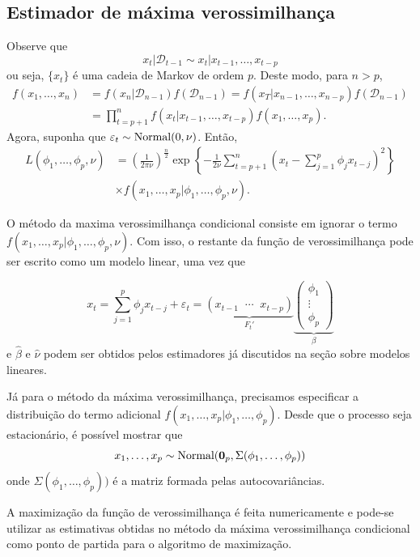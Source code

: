 \documentclass[
  letterpaper,
  DIV=11,
  numbers=noendperiod]{scrartcl}
\theoremstyle{plain}
\theoremstyle{plain}
\theoremstyle{definition}
\theoremstyle{definition}
\theoremstyle{remark}
\begin{document}
\hypertarget{estimador-de-muxe1xima-verossimilhanuxe7a}{%
\subsection{Estimador de máxima
verossimilhança}\label{estimador-de-muxe1xima-verossimilhanuxe7a}}

Observe que \[x_t|\mathcal{D}_{t-1}\sim x_t|x_{t-1},\ldots,x_{t-p}\] ou
seja, \(\{x_t\}\) é uma cadeia de Markov de ordem \(p\). Deste modo,
para \(n>p\), \[\begin{align*}
f(x_{1},\ldots,x_n)&=f\left(x_n|\mathcal{D}_{n-1}\right)f\left(\mathcal{D}_{n-1}\right)=f\left(x_T|x_{n-1},\ldots,x_{n-p}\right)f\left(\mathcal{D}_{n-1}\right)\\
        &=\prod_{t=p+1}^{n}f\left(x_t|x_{t-1},\ldots,x_{t-p}\right) f(x_{1},\ldots,x_p).
        \end{align*}\] Agora, suponha que
\(\varepsilon_t\sim\hbox{Normal}(0,\nu)\). Então, \[\begin{align*}
L(\phi_1,\ldots,\phi_p,\nu)&=\left(\frac{1}{2\pi\nu}\right)^{\frac{n}{2}}\exp\left\{-\frac{1}{2\nu}\sum_{t=p+1}^n(x_t-\sum_{j=1}^p \phi_jx_{t-j})^2\right\}\\&\times f(x_{1},\ldots,x_p|\phi_1,\ldots,\phi_p,\nu).
        \end{align*}\]

O método da maxima verossimilhança condicional consiste em ignorar o
termo \(f(x_{1},\ldots,x_p|\phi_1,\ldots,\phi_p,\nu)\). Com isso, o
restante da função de verossimilhança pode ser escrito como um modelo
linear, uma vez que

\[x_t=\sum_{j=1}^p \phi_jx_{t-j}+\varepsilon_t=\underbrace{(x_{t-1}\;\;\cdots \;\;x_{t-p})}_{F_t'}\underbrace{\left(\begin{array}{c}\phi_1 \\ \vdots \\ \phi_p\end{array}\right)}_{\beta}\]
e \(\hat{\beta}\) e \(\hat{\nu}\) podem ser obtidos pelos estimadores já
discutidos na seção sobre modelos lineares.

Já para o método da máxima verossimilhança, precisamos especificar a
distribuição do termo adicional
\(f(x_1,\ldots,x_p|\phi_1,\ldots,\phi_p)\). Desde que o processo seja
estacionário, é possível mostrar que
\[x_1,\ldots,x_p\sim\hbox{Normal}(\textbf{0}_p,\Sigma(\phi_1,\ldots,\phi_p))\]
onde \(\Sigma(\phi_1,\ldots,\phi_p))\) é a matriz formada pelas
autocovariâncias.

A maximização da função de verossimilhança é feita numericamente e
pode-se utilizar as estimativas obtidas no método da máxima
verossimilhança condicional como ponto de partida para o algoritmo de
maximização.
\end{document}
